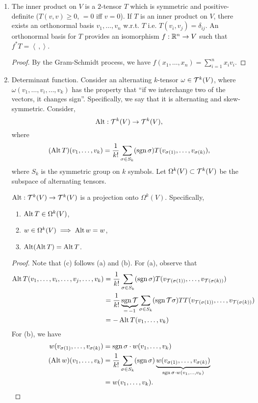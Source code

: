 \begin{enumerate}[label=(\roman*)]
    \item The inner product on $V$ is a $2$-tensor $T$ which is symmetric and positive-definite ($T(v, v) \geq 0$, $= 0$ iff $v = 0$). If $T$ is an inner product on $V$, there exists an orthonormal basis $v_1, \dots, v_n$ w.r.t. $T$ i.e. $T(v_i, v_j) = \delta_{ij}$. An orthonormal basis for $T$ provides an isomorphism $f : \mathbb R^n \to V$ such that $f^\ast T = \left< \, , \right>$.
    \begin{proof}
        By the Gram-Schmidt process, we have $f(x_1, \dots, x_n) = \sum_{i=1}^n x_i v_i$.
    \end{proof}
    \item Determinant function. Consider an alternating $k$-tensor $\omega \in \mathcal T^k(V)$, where $\omega(v_1, \dots, v_i, \dots, v_k)$ has the property that ``if we interchange two of the vectors, it changes sign''. Specifically, we say that it is alternating and skew-symmetric. Consider,
    \[ \operatorname{Alt} : \mathcal T^k(V) \to \mathcal T^k(V), \]
    where
    \[ (\operatorname{Alt} T)(v_1, \dots, v_k) = \frac{1}{k!} \sum_{\sigma \in S_k} (\operatorname{sgn} \sigma) T(v_{\sigma(1)}, \dots, v_{\sigma(k)}), \]
    where $S_k$ is the symmetric group on $k$ symbols. Let $\Omega^k(V) \subset \mathcal T^k(V)$ be the subspace of alternating tensors.
    \begin{simplethm}
        $\operatorname{Alt} : \mathcal T^k(V) \to \mathcal T^k(V)$ is a projection onto $\Omega^k(V)$. Specifically,
        \begin{enumerate}[label=(\alph*)]
            \item $\operatorname{Alt} T \in \Omega^k(V)$,
            \item $w \in \Omega^k(V) \implies \operatorname{Alt} w = w$,
            \item $\operatorname{Alt}(\operatorname{Alt} T) = \operatorname{Alt} T$.
        \end{enumerate}
        \begin{proof}
            Note that (c) follows (a) and (b). For (a), observe that
            \begin{align*}
                \operatorname{Alt} T(v_1, \dots, v_i, \dots, v_j, \dots, v_k) &= \frac{1}{k!} \sum_{\sigma \in S_k} (\operatorname{sgn} \sigma) T(v_{\mathcal T(\sigma(1))}, \dots, v_{\mathcal T(\sigma(k))}) \\
                &= \frac{1}{k!} \underbrace{\operatorname{sgn} \mathcal T}_{= \, -1} \sum_{\sigma \in S_k} (\operatorname{sgn} \mathcal T \sigma) TT(v_{\mathcal T(\sigma(1))}, \dots, v_{\mathcal T(\sigma(k))}) \\
                &= - \operatorname{Alt} T(v_1, \dots, v_k)
            \end{align*}
            For (b), we have
            \begin{align*}
                w(v_{\sigma(1)}, \dots, v_{\sigma(k)}) &= \operatorname{sgn} \sigma \cdot w(v_1, \dots, v_k) \\
                (\operatorname{Alt} w)(v_1, \dots, v_k) &= \frac{1}{k!} \sum_{\sigma \in S_k} (\operatorname{sgn} \sigma) \underbrace{w(v_{\sigma(1)}, \dots, v_{\sigma(k)})}_{\operatorname{sgn} \sigma \cdot w(v_1, \dots, v_k)} \\
                &= w(v_1, \dots, v_k). \qedhere
            \end{align*}
        \end{proof}
    \end{simplethm}
\end{enumerate}